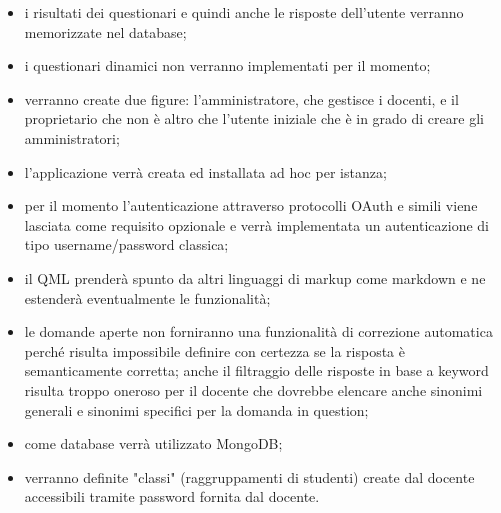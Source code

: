 \documentclass[12pt,a4paper]{article}
\begin{document}
\begin{itemize}
    \item i risultati dei questionari e quindi anche le risposte dell'utente verranno memorizzate nel
        database;
    \item i questionari dinamici non verranno implementati per il momento;
    \item verranno create due figure: l'amministratore, che gestisce i docenti, e il proprietario
        che non è altro che l'utente iniziale che è in grado di creare gli amministratori;
    \item l'applicazione verrà creata ed installata ad hoc per istanza;
    \item per il momento l'autenticazione attraverso protocolli OAuth e simili viene lasciata
        come requisito opzionale e verrà implementata un autenticazione di tipo username/password
        classica;
    \item il QML prenderà spunto da altri linguaggi di markup come markdown e ne estenderà
        eventualmente le funzionalità;
    \item le domande aperte non forniranno una funzionalità di correzione automatica perché
        risulta impossibile definire con certezza se la risposta è semanticamente corretta;
        anche il filtraggio delle risposte in base a keyword risulta troppo oneroso per
        il docente che dovrebbe elencare anche sinonimi generali e sinonimi specifici per la
        domanda in question;
    \item come database verrà utilizzato MongoDB;
    \item verranno definite "classi" (raggruppamenti di studenti) create dal docente         accessibili tramite password fornita dal docente.
\end{itemize}
\end{document}
